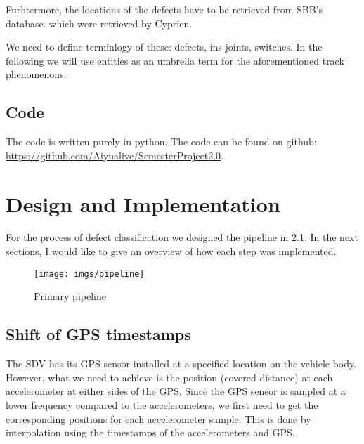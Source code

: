 
Furhtermore, the locations of the defects have to be retrieved from SBB's database. which were retrieved by Cyprien.


We need to define terminlogy of these: defects, ins joints, switches. In the following we will use entities as an umbrella term for the aforementioned track phenomenons.

\section{Code}
The code is written purely in python. The code can be found on github: \\
\url{https://github.com/Aiyualive/SemesterProject2.0}.



\chapter{Design and Implementation}

For the process of defect classification we designed the pipeline in \ref{fig:pipeline}. In the next sections, I would like to give an overview of how each step was implemented.
\begin{figure}[H]
	\centering
	\texttt{[image: imgs/pipeline]}
	\caption{Primary pipeline}
	\label{fig:pipeline}
\end{figure}




\section{Shift of GPS timestamps}
The SDV has its GPS sensor installed at a specified location on the vehicle body. However, what we need to achieve is the position (covered distance) at each accelerometer at either sides of the GPS. Since the GPS sensor is sampled at a lower frequency compared to the accelerometers, we first need to get the corresponding positions for each accelerometer sample. This is done by interpolation using the timestamps of the accelerometers and GPS. 

